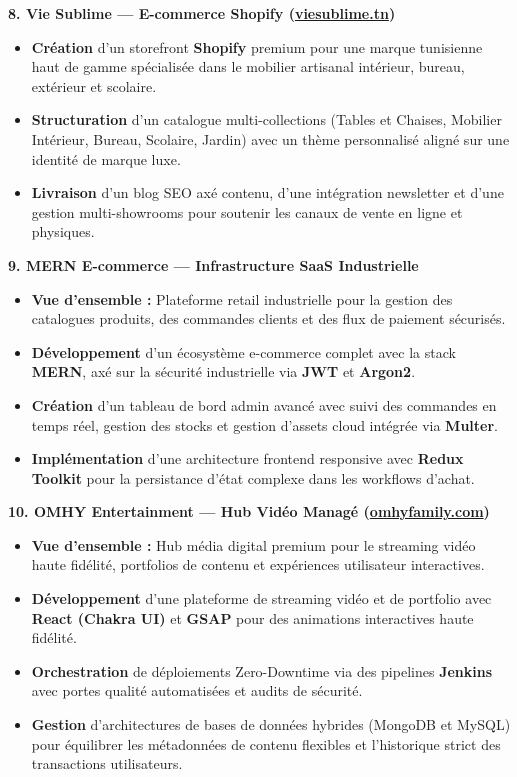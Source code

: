 \documentclass[10pt, letterpaper]{article}
\newenvironment{highlights}{
\begin{itemize}[leftmargin=12pt, itemsep=2pt]
}{
\end{itemize}
}
\begin{document}
\textbf{8. Vie Sublime --- E-commerce Shopify (\href{https://viesublime.tn}{viesublime.tn})}
\begin{highlights}
\item \textbf{Création} d'un storefront \textbf{Shopify} premium pour une marque tunisienne haut de gamme spécialisée dans le mobilier artisanal intérieur, bureau, extérieur et scolaire.
\item \textbf{Structuration} d'un catalogue multi-collections (Tables et Chaises, Mobilier Intérieur, Bureau, Scolaire, Jardin) avec un thème personnalisé aligné sur une identité de marque luxe.
\item \textbf{Livraison} d'un blog SEO axé contenu, d'une intégration newsletter et d'une gestion multi-showrooms pour soutenir les canaux de vente en ligne et physiques.
\end{highlights}

\textbf{9. MERN E-commerce --- Infrastructure SaaS Industrielle}
\begin{highlights}
\item \textbf{Vue d'ensemble :} Plateforme retail industrielle pour la gestion des catalogues produits, des commandes clients et des flux de paiement sécurisés.
\item \textbf{Développement} d'un écosystème e-commerce complet avec la stack \textbf{MERN}, axé sur la sécurité industrielle via \textbf{JWT} et \textbf{Argon2}.
\item \textbf{Création} d'un tableau de bord admin avancé avec suivi des commandes en temps réel, gestion des stocks et gestion d'assets cloud intégrée via \textbf{Multer}.
\item \textbf{Implémentation} d'une architecture frontend responsive avec \textbf{Redux Toolkit} pour la persistance d'état complexe dans les workflows d'achat.
\end{highlights}

\textbf{10. OMHY Entertainment --- Hub Vidéo Managé (\href{https://www.omhyfamily.com/}{omhyfamily.com})}
\begin{highlights}
\item \textbf{Vue d'ensemble :} Hub média digital premium pour le streaming vidéo haute fidélité, portfolios de contenu et expériences utilisateur interactives.
\item \textbf{Développement} d'une plateforme de streaming vidéo et de portfolio avec \textbf{React (Chakra UI)} et \textbf{GSAP} pour des animations interactives haute fidélité.
\item \textbf{Orchestration} de déploiements Zero-Downtime via des pipelines \textbf{Jenkins} avec portes qualité automatisées et audits de sécurité.
\item \textbf{Gestion} d'architectures de bases de données hybrides (MongoDB et MySQL) pour équilibrer les métadonnées de contenu flexibles et l'historique strict des transactions utilisateurs.
\end{highlights}
\end{document}
